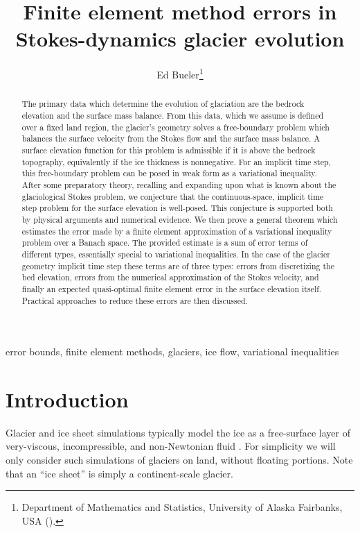 \documentclass[hidelinks,onefignum,onetabnum,final]{siamart220329}  %
\title{Finite element method errors in Stokes-dynamics glacier evolution}
\author{Ed Bueler\thanks{Department of Mathematics and Statistics, University of Alaska Fairbanks, USA (\email{elbueler@alaska.edu}).}}
\begin{document}
\maketitle

\begin{abstract}
The primary data which determine the evolution of glaciation are the bedrock elevation and the surface mass balance.  From this data, which we assume is defined over a fixed land region, the glacier's geometry solves a free-boundary problem which balances the surface velocity from the Stokes flow and the surface mass balance.  A surface elevation function for this problem is admissible if it is above the bedrock topography, equivalently if the ice thickness is nonnegative.  For an implicit time step, this free-boundary problem can be posed in weak form as a variational inequality.  After some preparatory theory, recalling and expanding upon what is known about the glaciological Stokes problem, we conjecture that the continuous-space, implicit time step problem for the surface elevation is well-posed.  This conjecture is supported both by physical arguments and numerical evidence.  We then prove a general theorem which estimates the error made by a finite element approximation of a variational inequality problem over a Banach space.  The provided estimate is a sum of error terms of different types, essentially special to variational inequalities.  In the case of the glacier geometry implicit time step these terms are of three types: errors from discretizing the bed elevation, errors from the numerical approximation of the Stokes velocity, and finally an expected quasi-optimal finite element error in the surface elevation itself.  Practical approaches to reduce these errors are then discussed.
\end{abstract}

\begin{keywords}
error bounds, finite element methods, glaciers, ice flow, variational inequalities
\end{keywords}


\section{Introduction} \label{sec:intro}

Glacier and ice sheet simulations typically model the ice as a free-surface layer of very-viscous, incompressible, and non-Newtonian fluid \cite{GreveBlatter2009,SchoofHewitt2013}.  For simplicity we will only consider such simulations of glaciers on land, without floating portions.  Note that an ``ice sheet'' is simply a continent-scale glacier.
\end{document}
